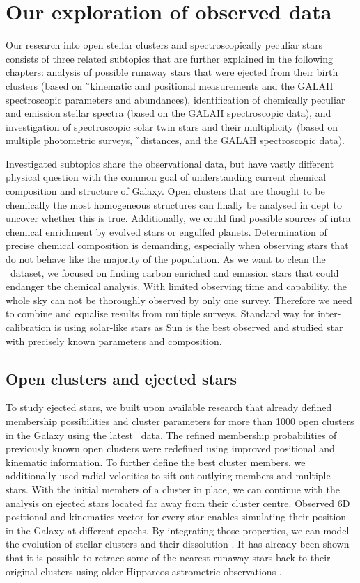 \section{Our exploration of observed data}
Our research into open stellar clusters and spectroscopically peculiar stars consists of three related subtopics that are further explained in the following chapters: analysis of possible runaway stars that were ejected from their birth clusters (based on \G\ kinematic and positional measurements and the GALAH spectroscopic parameters and abundances), identification of chemically peculiar and emission stellar spectra (based on the GALAH spectroscopic data), and investigation of spectroscopic solar twin stars and their multiplicity (based on multiple photometric surveys, \G\ distances, and the GALAH spectroscopic data).

Investigated subtopics share the observational data, but have vastly different physical question with the common goal of understanding current chemical composition and structure of Galaxy. Open clusters that are thought to be chemically the most homogeneous structures can finally be analysed in dept to uncover whether this is true. Additionally, we could find possible sources of intra chemical enrichment by evolved stars or engulfed planets. Determination of precise chemical composition is demanding, especially when observing stars that do not behave like the majority of the population. As we want to clean the \Gh\ dataset, we focused on finding carbon enriched and emission stars that could endanger the chemical analysis. With limited observing time and capability, the whole sky can not be thoroughly observed by only one survey. Therefore we need to combine and equalise results from multiple surveys. Standard way for inter-calibration is using solar-like stars as Sun is the best observed and studied star with precisely known parameters and composition.

\subsection{Open clusters and ejected stars}
To study ejected stars, we built upon available research that already defined membership possibilities and cluster parameters for more than 1000 open clusters in the Galaxy \cite{2018A&A...618A..93C} using the latest \Gs\ data. The refined membership probabilities of previously known open clusters \cite{2013A&A...558A..53K} were redefined using improved positional and kinematic information. To further define the best cluster members, we additionally used radial velocities to sift out outlying members and multiple stars. With the initial members of a cluster in place, we can continue with the analysis on ejected stars located far away from their cluster centre. Observed 6D positional and kinematics vector for every star enables simulating their position in the Galaxy at different epochs. By integrating those properties, we can model the evolution of stellar clusters and their dissolution \cite{1998A&A...337..363P}. It has already been shown that it is possible to retrace some of the nearest runaway stars back to their original clusters using older Hipparcos astrometric observations \cite{2000ApJ...544L.133H}.

